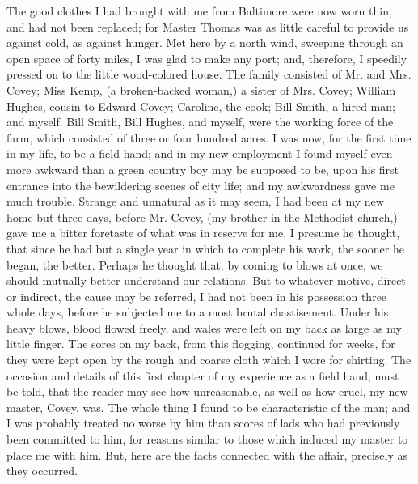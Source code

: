 The good clothes I had brought with me from Baltimore were now worn
thin, and had not been replaced; for Master Thomas was as little careful
to provide us against cold, as against hunger. Met here by a north wind,
sweeping through an open space of forty miles, I was glad to make any
port; and, therefore, I speedily pressed on to the little wood-colored
house. The family consisted of Mr. and Mrs. Covey; Miss Kemp, (a
broken-backed woman,) a sister of Mrs. Covey; William Hughes, cousin to
Edward Covey; Caroline, the cook; Bill Smith, a hired man; and myself.
Bill Smith, Bill Hughes, and myself, were the working force of the farm,
which consisted of three or four hundred acres. I was now, for the first
time in my life, to be a field hand; and in my new employment I found
myself even more awkward than a green country boy may be supposed to be,
{}upon his first entrance into the bewildering scenes of city life; and
my awkwardness gave me much trouble. Strange and unnatural as it may
seem, I had been at my new home but three days, before Mr. Covey, (my
brother in the Methodist church,) gave me a bitter foretaste of what was
in reserve for me. I presume he thought, that since he had but a single
year in which to complete his work, the sooner he began, the better.
Perhaps he thought that, by coming to blows at once, we should mutually
better understand our relations. But to whatever motive, direct or
indirect, the cause may be referred, I had not been in his possession
three whole days, before he subjected me to a most brutal chastisement.
Under his heavy blows, blood flowed freely, and wales were left on my
back as large as my little finger. The sores on my back, from this
flogging, continued for weeks, for they were kept open by the rough and
coarse cloth which I wore for shirting. The occasion and details of this
first chapter of my experience as a field hand, must be told, that the
reader may see how unreasonable, as well as how cruel, my new master,
Covey, was. The whole thing I found to be characteristic of the man; and
I was probably treated no worse by him than scores of lads who had
previously been committed to him, for reasons similar to those which
induced my master to place me with him. But, here are the facts
connected with the affair, precisely as they occurred.

